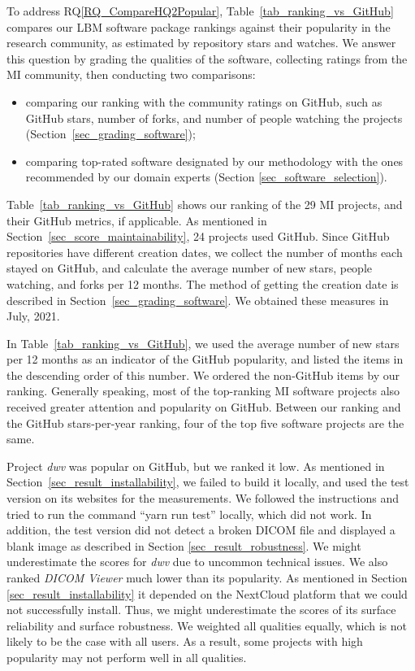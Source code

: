 \documentclass[final, 3p, times, authoryear]{elsarticle}
\newcommand{\rqref}[1]{RQ\ref{#1}}
\begin{document}
To address \rqref{RQ_CompareHQ2Popular}, Table~\ref{tab_ranking_vs_GitHub}
compares our LBM software package rankings against their popularity in the
research community, as estimated by repository stars and watches. We answer this
question by grading the qualities of the software, collecting ratings from the
MI community, then conducting two comparisons:
\begin{itemize}
\item comparing our ranking with the community ratings on GitHub, such as GitHub
stars, number of forks, and number of people watching the projects (Section~\ref{sec_grading_software});
\item comparing top-rated software designated by our methodology with the ones
recommended by our domain experts (Section \ref{sec_software_selection}).
\end{itemize}

Table~\ref{tab_ranking_vs_GitHub} shows our ranking of the 29 MI projects, and
their GitHub metrics, if applicable. As mentioned in
Section~\ref{sec_score_maintainability}, 24 projects used GitHub. Since GitHub
repositories have different creation dates, we collect the number of months each
stayed on GitHub, and calculate the average number of new stars, people
watching, and forks per 12 months. The method of getting the creation date is
described in Section~\ref{sec_grading_software}.  We obtained these
measures in July, 2021.

In Table~\ref{tab_ranking_vs_GitHub}, we used the average number of new stars
per 12 months as an indicator of the GitHub popularity, and listed the items in
the descending order of this number. We ordered the non-GitHub items by our
ranking. Generally speaking, most of the top-ranking MI software projects also
received greater attention and popularity on GitHub. Between our ranking and the
GitHub stars-per-year ranking, four of the top five software projects are the
same.

Project \textit{dwv} was popular on GitHub, but we ranked it low. As mentioned
in Section~\ref{sec_result_installability}, we failed to build it locally, and
used the test version on its websites for the measurements. We followed the
instructions and tried to run the command ``yarn run test'' locally, which did
not work. In addition, the test version did not detect a broken DICOM file and
displayed a blank image as described in Section \ref{sec_result_robustness}. We
might underestimate the scores for \textit{dwv} due to uncommon technical
issues. We also ranked \textit{DICOM Viewer} much lower than its popularity. As
mentioned in Section \ref{sec_result_installability} it depended on the
NextCloud platform that we could not successfully install. Thus, we might
underestimate the scores of its surface reliability and surface
robustness. We weighted all qualities equally, which is not likely to be the
case with all users. As a result, some projects with high popularity may not
perform well in all qualities.
\end{document}
